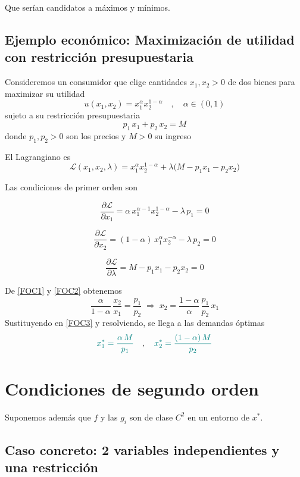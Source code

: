 \documentclass{article}
\begin{document}
Que serían candidatos a máximos y mínimos.
\subsection*{Ejemplo económico: Maximización de utilidad con restricción presupuestaria}

Consideremos un consumidor que elige cantidades \(x_1,x_2>0\) de dos bienes para maximizar su utilidad  
\[
u(x_1,x_2)=x_1^{\alpha}x_2^{1-\alpha}
\quad,\quad
\alpha\in(0,1)
\]
sujeto a su restricción presupuestaria  
\[
p_1\,x_1 + p_2\,x_2 = M
\]
donde \(p_1,p_2>0\) son los precios y \(M>0\) su ingreso

El Lagrangiano es  
\[
\mathcal{L}(x_1,x_2,\lambda)=x_1^{\alpha}x_2^{1-\alpha}+\lambda\bigl(M - p_1x_1 - p_2x_2\bigr)
\]

Las condiciones de primer orden son  

\begin{equation}
\frac{\partial\mathcal{L}}{\partial x_1}=\alpha\,x_1^{\alpha-1}x_2^{1-\alpha}-\lambda\,p_1=0
\label{FOC1}
\end{equation}

\begin{equation}
\frac{\partial\mathcal{L}}{\partial x_2}=(1-\alpha)\,x_1^{\alpha}x_2^{-\alpha}-\lambda\,p_2=0
\label{FOC2}
\end{equation}

\begin{equation}
\frac{\partial\mathcal{L}}{\partial \lambda}=M - p_1x_1 - p_2x_2=0
\label{FOC3}
\end{equation}

De \eqref{FOC1} y \eqref{FOC2} obtenemos  
\[
\frac{\alpha}{1-\alpha}\,\frac{x_2}{x_1}=\frac{p_1}{p_2}
\;\Longrightarrow\;
x_2=\frac{1-\alpha}{\alpha}\,\frac{p_1}{p_2}\,x_1
\]
Sustituyendo en \eqref{FOC3} y resolviendo, se llega a las demandas óptimas  
\[
{\color{teal}x_1^*=\frac{\alpha\,M}{p_1}}
\quad,\quad
{\color{teal}x_2^*=\frac{(1-\alpha)\,M}{p_2}}
\]




\section*{Condiciones de segundo orden}


Suponemos además que \(f\) y las \(g_i\) son de clase \(C^2\) en un entorno de \(x^*\).
\subsection*{Caso concreto: 2 variables independientes y una restricción}
\end{document}
